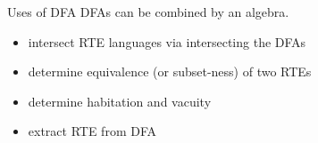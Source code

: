\begin{frame}{Uses of DFA}
  DFAs can be combined by an algebra.

  \begin{itemize}
  \item intersect RTE languages via intersecting the DFAs
  \item determine equivalence (or subset-ness) of two RTEs
  \item determine habitation and vacuity
  \item extract RTE from DFA
  \end{itemize}
\end{frame}



